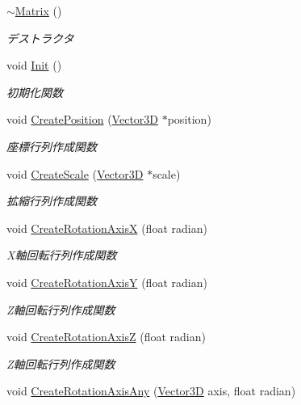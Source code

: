 \begin{DoxyCompactItemize}
\mbox{\hyperlink{class_matrix_a9b1c3627f573d78a2f08623fdfef990f}{$\sim$\+Matrix}} ()
\begin{DoxyCompactList}\small\item\em デストラクタ \end{DoxyCompactList}\item 
void \mbox{\hyperlink{class_matrix_ab37ebbd9de3da47ebdcf332cebcc0cc0}{Init}} ()
\begin{DoxyCompactList}\small\item\em 初期化関数 \end{DoxyCompactList}\item 
void \mbox{\hyperlink{class_matrix_aef12300dcca7a1256e8437dcc6619b56}{Create\+Position}} (\mbox{\hyperlink{class_vector3_d}{Vector3D}} $\ast$position)
\begin{DoxyCompactList}\small\item\em 座標行列作成関数 \end{DoxyCompactList}\item 
void \mbox{\hyperlink{class_matrix_a334baeec0ce11d8766a3e5679aa0ebca}{Create\+Scale}} (\mbox{\hyperlink{class_vector3_d}{Vector3D}} $\ast$scale)
\begin{DoxyCompactList}\small\item\em 拡縮行列作成関数 \end{DoxyCompactList}\item 
void \mbox{\hyperlink{class_matrix_abac995d9979d7f308e824cdfc17ce5df}{Create\+Rotation\+AxisX}} (float radian)
\begin{DoxyCompactList}\small\item\em X軸回転行列作成関数 \end{DoxyCompactList}\item 
void \mbox{\hyperlink{class_matrix_a3ccd2f99d93caa2bbabd34f6db9ab309}{Create\+Rotation\+AxisY}} (float radian)
\begin{DoxyCompactList}\small\item\em Z軸回転行列作成関数 \end{DoxyCompactList}\item 
void \mbox{\hyperlink{class_matrix_a5b4832fd2246c43250b138980e446f72}{Create\+Rotation\+AxisZ}} (float radian)
\begin{DoxyCompactList}\small\item\em Z軸回転行列作成関数 \end{DoxyCompactList}\item 
void \mbox{\hyperlink{class_matrix_a4e451875514019630942739f04294132}{Create\+Rotation\+Axis\+Any}} (\mbox{\hyperlink{class_vector3_d}{Vector3D}} axis, float radian)

\end{DoxyCompactItemize}
